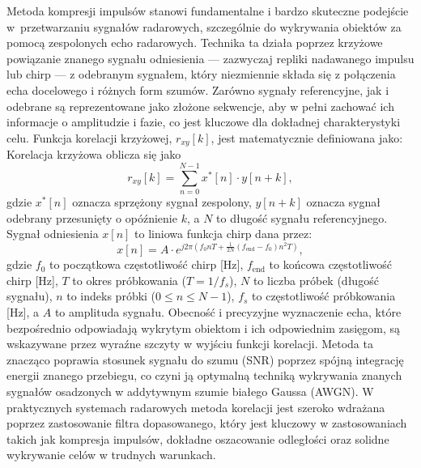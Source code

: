 Metoda kompresji impulsów \cite{Ducoff2008_PulseCompression} stanowi fundamentalne i bardzo skuteczne podejście w~przetwarzaniu sygnałów radarowych, szczególnie do wykrywania obiektów za pomocą zespolonych echo radarowych. Technika ta działa poprzez krzyżowe powiązanie znanego sygnału odniesienia — zazwyczaj repliki nadawanego impulsu lub chirp — z odebranym sygnałem, który niezmiennie składa się z połączenia echa docelowego i różnych form szumów. Zarówno sygnały referencyjne, jak i odebrane są reprezentowane jako złożone sekwencje, aby w pełni zachować ich informacje o amplitudzie i fazie, co jest kluczowe dla dokładnej charakterystyki celu. Funkcja korelacji krzyżowej, $r_{xy}[k]$, jest matematycznie definiowana jako:
Korelacja krzyżowa oblicza się jako
\begin{equation}
\label{eq:correlation}
r_{xy}[k] = \sum_{n=0}^{N-1} x^*[n] \cdot y[n+k],
\end{equation}
gdzie $x^*[n]$ oznacza sprzężony sygnał zespolony, $y[n+k]$ oznacza sygnał odebrany przesunięty o opóźnienie $k$, a $N$ to długość sygnału referencyjnego. Sygnał odniesienia $x[n]$ to liniowa funkcja chirp dana przez: 
\begin{equation}
\label{eq:linearChirp}
x[n] = A \cdot e^{j 2\pi \left( f_0 nT + \frac{1}{2N}(f_{\text{end}} - f_0) n^2 T \right)},
\end{equation}
gdzie $f_0$ to początkowa częstotliwość chirp [Hz], $f_{\text{end}}$ to końcowa częstotliwość chirp [Hz], $T$ to okres próbkowania ($T = 1/f_s$), $N$ to liczba próbek (długość sygnału), $n$ to indeks próbki ($0 \leq n \leq N-1$), $f_s$ to częstotliwość próbkowania [Hz], a $A$ to amplituda sygnału.
Obecność i precyzyjne wyznaczenie echa, które bezpośrednio odpowiadają wykrytym obiektom i ich odpowiednim zasięgom, są wskazywane przez wyraźne szczyty w wyjściu funkcji korelacji. Metoda ta znacząco poprawia stosunek sygnału do szumu (SNR) poprzez spójną integrację energii znanego przebiegu, co czyni ją optymalną techniką wykrywania znanych sygnałów osadzonych w addytywnym szumie białego Gaussa (AWGN). W praktycznych systemach radarowych metoda korelacji jest szeroko wdrażana poprzez zastosowanie filtra dopasowanego, który jest kluczowy w zastosowaniach takich jak kompresja impulsów, dokładne oszacowanie odległości oraz solidne wykrywanie celów w trudnych warunkach.


